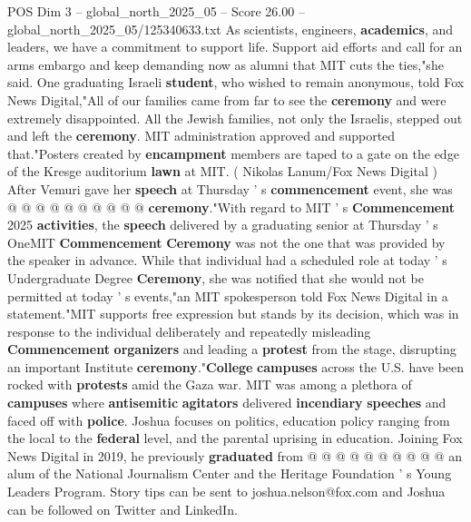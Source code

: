 \begin{textsample}{POS Dim 3 – global\_north\_2025\_05 – Score 26.00 – global\_north\_2025\_05/125340633.txt}
As scientists, engineers, \textbf{academics}, and leaders, we have a commitment to support life.
Support aid efforts and call for an arms embargo and keep demanding now as alumni that MIT cuts the ties,"she said.
One graduating Israeli \textbf{student}, who wished to remain anonymous, told Fox News Digital,"All of our families came from far to see the \textbf{ceremony} and were extremely disappointed.
All the Jewish families, not only the Israelis, stepped out and left the \textbf{ceremony}.
MIT administration approved and supported that."Posters created by \textbf{encampment} members are taped to a gate on the edge of the Kresge auditorium \textbf{lawn} at MIT. ( Nikolas Lanum/Fox News Digital ) After Vemuri gave her \textbf{speech} at Thursday ' s \textbf{commencement} event, she was @ @ @ @ @ @ @ @ @ @ \textbf{ceremony}."With regard to MIT ' s \textbf{Commencement} 2025 \textbf{activities}, the \textbf{speech} delivered by a graduating senior at Thursday ' s OneMIT \textbf{Commencement} \textbf{Ceremony} was not the one that was provided by the speaker in advance.
While that individual had a scheduled role at today ' s Undergraduate Degree \textbf{Ceremony}, she was notified that she would not be permitted at today ' s events,"an MIT spokesperson told Fox News Digital in a statement."MIT supports free expression but stands by its decision, which was in response to the individual deliberately and repeatedly misleading \textbf{Commencement} \textbf{organizers} and leading a \textbf{protest} from the stage, disrupting an important Institute \textbf{ceremony}."\textbf{College} \textbf{campuses} across the U.S. have been rocked with \textbf{protests} amid the Gaza war.
MIT was among a plethora of \textbf{campuses} where \textbf{antisemitic} \textbf{agitators} delivered \textbf{incendiary} \textbf{speeches} and faced off with \textbf{police}.
Joshua focuses on politics, education policy ranging from the local to the \textbf{federal} level, and the parental uprising in education.
Joining Fox News Digital in 2019, he previously \textbf{graduated} from @ @ @ @ @ @ @ @ @ @ an alum of the National Journalism Center and the Heritage Foundation ' s Young Leaders Program.
Story tips can be sent to joshua.nelson@fox.com and Joshua can be followed on Twitter and LinkedIn.

\end{textsample}
